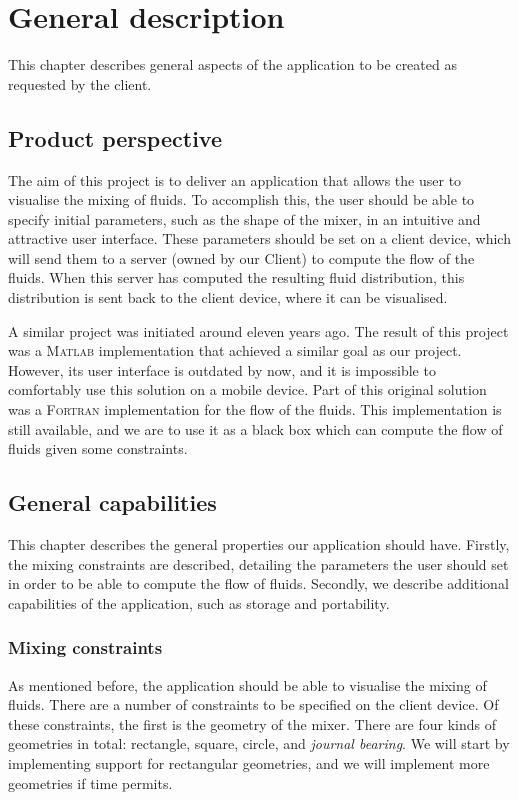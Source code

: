 \chapter{General description}
This chapter describes general aspects of the application to be created as requested by the client.

\section{Product perspective} %
The aim of this project is to deliver an application that allows the user to visualise the mixing of fluids. To accomplish this, the user should be able to specify initial parameters, such as the shape of the mixer, in an intuitive and attractive user interface. These parameters should be set on a client device, which will send them to a server (owned by our Client) to compute the flow of the fluids. When this server has computed the resulting fluid distribution, this distribution is sent back to the client device, where it can be visualised.

A similar project was initiated around eleven years ago. The result of this project was a \textsc{Matlab} implementation that achieved a similar goal as our project. However, its user interface is outdated by now, and it is impossible to comfortably use this solution on a mobile device. Part of this original solution was a \textsc{Fortran} implementation for the flow of the fluids. This implementation is still available, and we are to use it as a black box which can compute the flow of fluids given some constraints.

\section{General capabilities}
This chapter describes the general properties our application should have. Firstly, the mixing constraints are described, detailing the parameters the user should set in order to be able to compute the flow of fluids. Secondly, we describe additional capabilities of the application, such as storage and portability.

\subsection{Mixing constraints}\label{mixingconstraints}
As mentioned before, the application should be able to visualise the mixing of fluids. There are a number of constraints to be specified on the client device. Of these constraints, the first is the geometry of the mixer. There are four kinds of geometries in total: rectangle, square, circle, and \emph{journal bearing}. We will start by implementing support for rectangular geometries, and we will implement more geometries if time permits.

